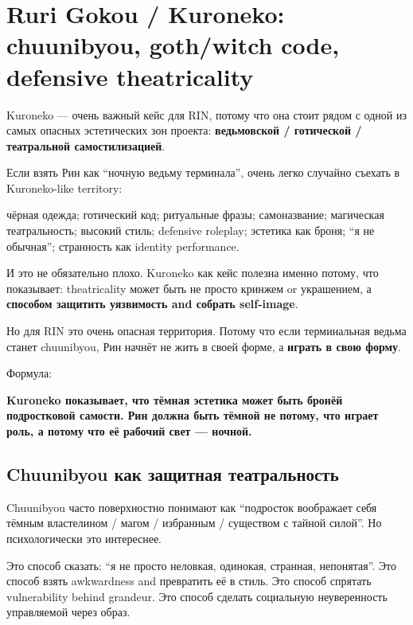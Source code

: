 \section{Ruri Gokou / Kuroneko: chuunibyou, goth/witch code, defensive theatricality}

Kuroneko --- очень важный кейс для RIN, потому что она стоит рядом с
одной из самых опасных эстетических зон проекта: \textbf{ведьмовской /\hspace{0pt}
готической /\hspace{0pt} театральной самостилизацией}.

Если взять Рин как ``ночную ведьму терминала'', очень легко случайно
съехать в Kuroneko-like territory:

чёрная одежда; готический код; ритуальные фразы; самоназвание;
магическая театральность; высокий стиль; defensive roleplay; эстетика
как броня; ``я не обычная''; странность как identity performance.

И это не обязательно плохо. Kuroneko как кейс полезна именно потому, что
показывает: theatricality может быть не просто кринжем or украшением, а
\textbf{способом защитить уязвимость and собрать self-image}.

Но для RIN это очень опасная территория. Потому что если терминальная
ведьма станет chuunibyou, Рин начнёт не жить в своей форме, а
\textbf{играть в свою форму}.

Формула:

\textbf{Kuroneko показывает, что тёмная эстетика может быть бронёй
подростковой самости. Рин должна быть тёмной не потому, что играет роль,
а потому что её рабочий свет --- ночной.}

\subsection*{Chuunibyou как защитная театральность}

Chuunibyou часто поверхностно понимают как ``подросток воображает себя
тёмным властелином /\hspace{0pt} магом /\hspace{0pt} избранным /\hspace{0pt} существом с тайной силой''. Но
психологически это интереснее.

Это способ сказать: ``я не просто неловкая, одинокая, странная,
непонятая''. Это способ взять awkwardness and превратить её в стиль. Это
способ спрятать vulnerability behind grandeur. Это способ сделать
социальную неуверенность управляемой через образ.

